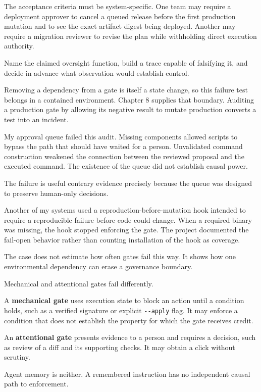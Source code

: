 The acceptance criteria must be system-specific. One team may require a deployment approver to cancel a queued release before the first production mutation and to see the exact artifact digest being deployed. Another may require a migration reviewer to revise the plan while withholding direct execution authority.

Name the claimed oversight function, build a trace capable of falsifying it, and decide in advance what observation would establish control.

Removing a dependency from a gate is itself a state change, so this failure test belongs in a contained environment. Chapter 8 supplies that boundary. Auditing a production gate by allowing its negative result to mutate production converts a test into an incident.

My approval queue failed this audit. Missing components allowed scripts to bypass the path that should have waited for a person. Unvalidated command construction weakened the connection between the reviewed proposal and the executed command. The existence of the queue did not establish causal power.

The failure is useful contrary evidence precisely because the queue was designed to preserve human-only decisions.

Another of my systems used a reproduction-before-mutation hook intended to require a reproducible failure before code could change. When a required binary was missing, the hook stopped enforcing the gate. The project documented the fail-open behavior rather than counting installation of the hook as coverage.

The case does not estimate how often gates fail this way. It shows how one environmental dependency can erase a governance boundary.

Mechanical and attentional gates fail differently.

A \textbf{mechanical gate} uses execution state to block an action until a condition holds, such as a verified signature or explicit \texttt{-\/-apply} flag. It may enforce a condition that does not establish the property for which the gate receives credit.

An \textbf{attentional gate} presents evidence to a person and requires a decision, such as review of a diff and its supporting checks. It may obtain a click without scrutiny.

Agent memory is neither. A remembered instruction has no independent causal path to enforcement.

